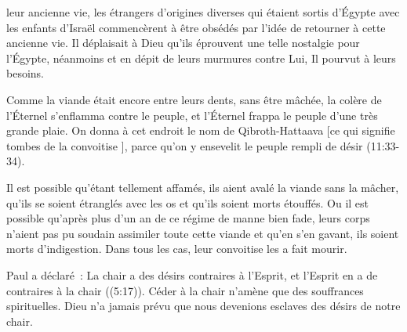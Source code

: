 \dvrule






 leur ancienne vie,
 les étrangers d'origines diverses qui étaient sortis d'Égypte
 avec les enfants d'Israël commencèrent à être obsédés
 par l'idée de retourner à cette ancienne vie.
 Il déplaisait à Dieu qu'ils éprouvent une telle nostalgie pour l'Égypte,
 néanmoins et en dépit de leurs murmures contre Lui, Il pourvut à leurs besoins.

\og Comme la viande était encore entre leurs dents, sans être mâchée,
 la colère de l'Éternel s'enflamma contre le peuple, et l'Éternel
 frappa le peuple d'une très grande plaie.
 On donna à cet endroit le nom de Qibroth-Hattaava
 [ce qui signifie \og tombes de la convoitise \fg{}],
 parce qu'on y ensevelit le peuple rempli de désir \fg{} (11:33-34).

Il est possible qu'étant tellement affamés,
 ils aient avalé la viande sans la mâcher,
 qu'ils se soient étranglés avec les os et qu'ils soient morts étouffés.
 Ou il est possible qu'après plus d'un an de ce régime de manne bien fade,
 leurs corps n'aient pas pu soudain assimiler toute cette viande
 et qu'en s'en gavant, ils soient morts d'indigestion.
 Dans tous les cas, leur convoitise les a fait mourir.


Paul a déclaré~:
 \og La chair a des désirs contraires à l'Esprit,
 et l'Esprit en a de contraires à la chair \fg{} ((5:17)).
 Céder à la chair n'amène que des souffrances spirituelles.
 Dieu n'a jamais prévu que nous devenions esclaves des désirs de notre chair.

\dvrule



